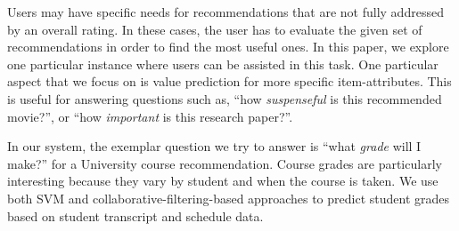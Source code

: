\documentclass{article} %
\begin{document}
Users may have specific needs for recommendations that are not fully addressed by an overall rating. In these cases, the user has to evaluate the given set of recommendations in order to find the most useful ones. In this paper, we explore one particular instance where users can be assisted in this task. One particular aspect that we focus on is value prediction for more specific item-attributes. This is useful for answering questions such as, ``how \textit{suspenseful} is this recommended movie?'', or ``how \textit{important} is this research paper?''. 


In our system, the exemplar question we try to answer is ``what \textit{grade} will I make?'' for a University course recommendation. Course grades are particularly interesting because they vary by student and when the course is taken. We use both SVM and collaborative-filtering-based approaches to predict student grades based on student transcript and schedule data.



\end{document}
